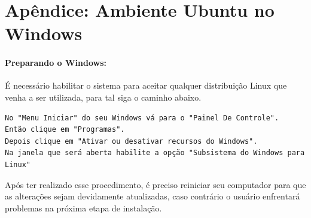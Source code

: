 \documentclass[12pt, a4paper]{article}
\begin{document}








\newpage
\appendix
\section{Apêndice: Ambiente Ubuntu no Windows}
\label{InstallUbuntu}

\paragraph{Preparando o Windows:} É necessário habilitar o sistema para aceitar qualquer distribuição Linux que venha a ser utilizada, para tal siga o caminho abaixo.

\begin{verbatim}
No "Menu Iniciar" do seu Windows vá para o "Painel De Controle".
Então clique em "Programas".
Depois clique em "Ativar ou desativar recursos do Windows".
Na janela que será aberta habilite a opção "Subsistema do Windows para Linux"
\end{verbatim}
Após ter realizado esse procedimento, é preciso reiniciar seu computador para que as alterações sejam devidamente atualizadas, caso contrário o usuário enfrentará problemas na próxima etapa de instalação.
\end{document}
